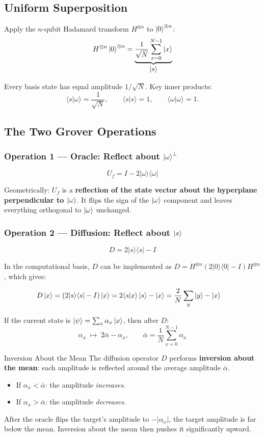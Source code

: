 \documentclass[12pt,a4paper]{article}
\newcommand{\proj}[1]{\vert#1\rangle\langle#1\vert}
\newcommand{\ip}[2]{\langle#1\vert#2\rangle}
\newcommand{\HH}{H^{\otimes n}}
\begin{document}
\subsection{Uniform Superposition}

Apply the $n$-qubit Hadamard transform $H^{\otimes n}$ to $\ket{0}^{\otimes n}$:
\[
  \HH\ket{0}^{\otimes n}
  = \underbrace{\frac{1}{\sqrt{N}}\sum_{x=0}^{N-1}\ket{x}}_{\displaystyle\ket{s}}
\]

Every basis state has equal amplitude $1/\sqrt{N}$. Key inner products:
\[
  \ip{s}{\omega} = \frac{1}{\sqrt{N}}, \qquad
  \ip{s}{s} = 1, \qquad
  \ip{\omega}{\omega} = 1.
\]

\subsection{The Two Grover Operations}

\subsubsection{Operation 1 — Oracle: Reflect about $\ket{\omega}^\perp$}

\[
  \boxed{U_f = I - 2\proj{\omega}}
\]

Geometrically: $U_f$ is a \textbf{reflection of the state vector about the hyperplane perpendicular to $\ket{\omega}$}. It flips the sign of the $\ket{\omega}$ component and leaves everything orthogonal to $\ket{\omega}$ unchanged.

\subsubsection{Operation 2 — Diffusion: Reflect about $\ket{s}$}

\[
  \boxed{D = 2\proj{s} - I}
\]

In the computational basis, $D$ can be implemented as $D = \HH(2\proj{0}-I)\HH$, which gives:

\begin{align}
  D\ket{x} &= (2\proj{s}-I)\ket{x}
            = 2\ip{s}{x}\ket{s} - \ket{x}
            = \frac{2}{N}\sum_{y}\ket{y} - \ket{x}
\end{align}

If the current state is $\ket{\psi} = \sum_x \alpha_x\ket{x}$, then after $D$:
\[
  \alpha_x \;\longmapsto\; 2\bar{\alpha} - \alpha_x,
  \qquad \bar{\alpha} = \frac{1}{N}\sum_{x=0}^{N-1}\alpha_x
\]

\begin{keybox}{Inversion About the Mean}
The diffusion operator $D$ performs \textbf{inversion about the mean}: each amplitude is reflected around the average amplitude $\bar\alpha$.
\begin{itemize}
  \item If $\alpha_x < \bar\alpha$: the amplitude \emph{increases}.
  \item If $\alpha_x > \bar\alpha$: the amplitude \emph{decreases}.
\end{itemize}
After the oracle flips the target's amplitude to $-|\alpha_\omega|$, the target amplitude is far below the mean. Inversion about the mean then pushes it significantly upward.
\end{keybox}
\end{document}

